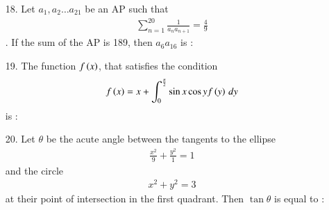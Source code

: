 \documentclass[journal,12pt,onecolumn]{IEEEtran}
\theoremstyle{remark}
\begin{document}
\begin{enumerate}
    \item[18.] Let $a_1, a_2 \dots a_{21}$ be an AP such that 
        \begin{align}
            \sum_{n = 1} ^{20} \frac{1}{a_{n}a_{n+1}} = \frac{4}{9}
        \end{align}. If the sum of the AP is 189, then $a_{6}a_{16}$ is : 
        \hfill{}
        \begin{enumerate}
        \end{enumerate}

    \item[19.]  The function $f\left(x\right)$, that satisfies the condition  
        \begin{align}
            f\left(x\right) = x + \int_{0} ^ {\frac{\pi}{2}} \sin x \cos y f\left(y\right) \, dy
        \end{align} 
        is : 
        \hfill{}
        \begin{enumerate}
        \end{enumerate}

    \item[20.] Let $\theta$ be the acute angle between the tangents to the ellipse 
        \begin{align}
            \frac{x^2}{9} + \frac{y^2}{1} = 1
        \end{align} and the circle 
        \begin{align}
            x^2 + y^2 = 3
        \end{align} at their point of intersection in the first quadrant. Then $\tan \theta$ is equal to :


\end{enumerate}
\end{document}
